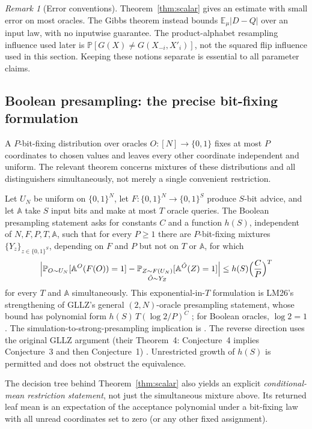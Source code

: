 \documentclass[11pt]{article}
\theoremstyle{definition}\newtheorem{definition}[theorem]{Definition}
\theoremstyle{remark}\newtheorem{remark}[theorem]{Remark}
\newcommand{\E}{\mathbb E}\newcommand{\Prb}{\mathbb P}
\begin{document}
\begin{remark}[Error conventions]
Theorem~\ref{thm:scalar} gives an estimate with small error on most oracles. The Gibbs theorem instead bounds \(\E_\mu|D-Q|\) over an input law, with no inputwise guarantee. The product-alphabet resampling influence used later is \(\Prb[G(X)\ne G(X_{-i},X'_i)]\), not the squared flip influence used in this section. Keeping these notions separate is essential to all parameter claims.
\end{remark}

\subsection{Boolean presampling: the precise bit-fixing formulation}
A \(P\)-bit-fixing distribution over oracles \(O:[N]\to\{0,1\}\) fixes at most \(P\) coordinates to chosen values and leaves every other coordinate independent and uniform. The relevant theorem concerns mixtures of these distributions and all distinguishers simultaneously, not merely a single convenient restriction.

Let \(U_N\) be uniform on \(\{0,1\}^N\), let \(F:\{0,1\}^N\to\{0,1\}^S\) produce \(S\)-bit advice, and let \(\mathbb A\) take \(S\) input bits and make at most \(T\) oracle queries. The Boolean presampling statement asks for constants \(C\) and a function \(h(S)\), independent of \(N,F,P,T,\mathbb A\), such that for every \(P\ge1\) there are \(P\)-bit-fixing mixtures \(\{Y_z\}_{z\in\{0,1\}^S}\), depending on \(F\) and \(P\) but not on \(T\) or \(\mathbb A\), for which
\[
 \Bigl|\Prb_{O\sim U_N}[\mathbb A^O(F(O))=1]-\Prb_{\substack{Z\sim F(U_N)\\\tilde O\sim Y_Z}}[\mathbb A^{\tilde O}(Z)=1]\Bigr|\le h(S)\Bigl(\frac CP\Bigr)^T
\]
for every \(T\) and \(\mathbb A\) simultaneously. This exponential-in-\(T\) formulation is LM26's strengthening of GLLZ's general \((2,N)\)-oracle presampling statement, whose bound has polynomial form \(h(S)\,T(\log2/P)^C\) \cite[Conjecture~4]{GLLZ21}; for Boolean oracles, \(\log2=1\). The simulation-to-strong-presampling implication is \cite[Theorem~5.7]{LM26}. The reverse direction uses the original GLLZ argument (their Theorem~4: Conjecture~4 implies Conjecture~3 and then Conjecture~1) \cite{GLLZ21}. Unrestricted growth of \(h(S)\) is permitted and does not obstruct the equivalence.

The decision tree behind Theorem~\ref{thm:scalar} also yields an explicit \emph{conditional-mean restriction statement}, not just the simultaneous mixture above. Its returned leaf mean is an expectation of the acceptance polynomial under a bit-fixing law with all unread coordinates set to zero (or any other fixed assignment).
\end{document}
